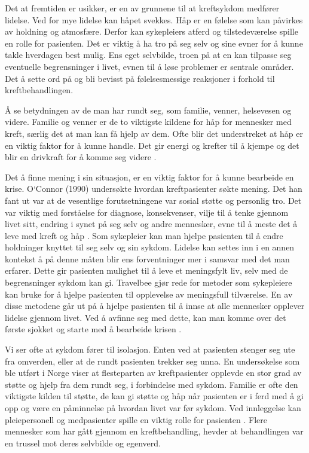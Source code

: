Det at fremtiden er usikker, er en av
grunnene til at kreftsykdom medfører lidelse. Ved for mye lidelse kan håpet
svekkes. Håp er en følelse som kan påvirkes av holdning og atmosfære. Derfor
kan sykepleiers atferd og tilstedeværelse spille en rolle for pasienten. Det er
viktig å ha tro på seg selv og sine evner for å kunne takle hverdagen best
mulig. Ens eget selvbilde, troen på at en kan tilpasse seg eventuelle
begrensninger i livet, evnen til å løse problemer er sentrale områder. Det å
sette ord på og bli bevisst på følelsesmessige reaksjoner i forhold til
kreftbehandlingen. 

Å se betydningen av de man har rundt seg, som familie,
venner, helsevesen og videre. Familie og venner er de to viktigste kildene for
håp for mennesker med kreft, særlig det at man kan få hjelp av dem. Ofte blir
det understreket at håp er en viktig faktor for å kunne handle. Det gir energi
og krefter til å kjempe og det blir en drivkraft for å komme seg videre
\cite[s.~40-41]{rustoen2008}.

Det å finne mening i sin situasjon, er en viktig faktor
for å kunne bearbeide en krise. O`Connor (1990) undersøkte hvordan
kreftpasienter søkte mening. Det han fant ut var at de vesentlige
forutsetningene var sosial støtte og personlig tro. Det var viktig med
forståelse for diagnose, konsekvenser, vilje til å tenke gjennom livet sitt,
endring i synet på seg selv og andre mennesker, evne til å meste det å leve med
kreft og håp \cite[s.~41]{rustoen2008}. Som sykepleier kan man hjelpe pasienten til å
endre holdninger knyttet til seg selv og sin sykdom. Lidelse kan settes inn i
en annen kontekst å på denne måten blir ens forventninger mer i samsvar med det
man erfarer. Dette gir pasienten mulighet til å leve et meningsfylt liv, selv
med de begrensninger sykdom kan gi. Travelbee gjør rede for metoder som
sykepleiere kan bruke for å hjelpe pasienten til opplevelse av meningsfull
tilværelse. En av disse metodene går ut på å hjelpe pasienten til å innse at
alle mennesker opplever lidelse gjennom livet. Ved å avfinne seg med dette, kan
man komme over det første sjokket og starte med å bearbeide krisen
\cite[s.~42]{rustoen2008}.

Vi ser ofte at sykdom fører til isolasjon. Enten ved at pasienten
stenger seg ute fra omverden, eller at de rundt pasienten trekker seg unna. En
undersøkelse som ble utført i Norge viser at flesteparten av kreftpasienter
opplevde en stor grad av støtte og hjelp fra dem rundt seg, i forbindelse med
sykdom. Familie er ofte den viktigste kilden til støtte, de kan gi støtte og
håp når pasienten er i ferd med å gi opp og være en påminnelse på hvordan livet
var før sykdom. Ved innleggelse kan pleiepersonell og medpasienter spille en
viktig rolle for pasienten \cite[s.~42]{rustoen2008}. Flere mennesker som har gått
gjennom en kreftbehandling, hevder at behandlingen var en trussel mot deres
selvbilde og egenverd.

